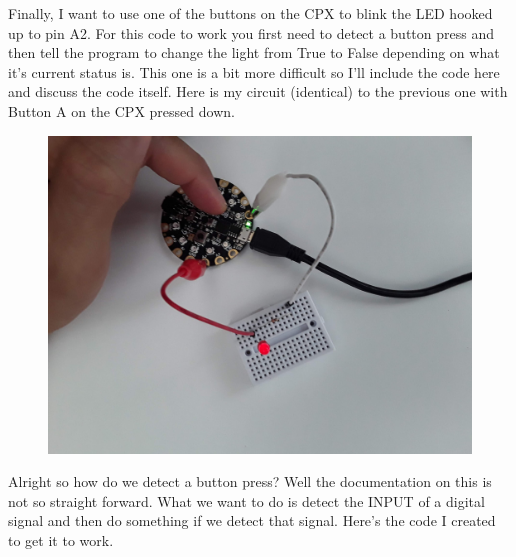 Finally, I want to use one of the buttons on the CPX to blink the LED
hooked up to pin A2. For this code to work you first need to detect a
button press and then tell the program to change the light from True
to False depending on what it’s current status is. This one is a bit
more difficult so I’ll include the code here and discuss the code
itself. Here is my circuit (identical) to the previous one with Button
A on the CPX pressed down. 
\begin{figure}[H]
  \begin{center}
    \includegraphics[width=\textwidth]{Figures/LED5.jpeg}
  \end{center}
\end{figure}
Alright so how do we detect a button press? Well the documentation on
this is not so straight forward. What we want to do is detect the
INPUT of a digital signal and then do something if we detect that
signal. Here’s the code I created to get it to work.
